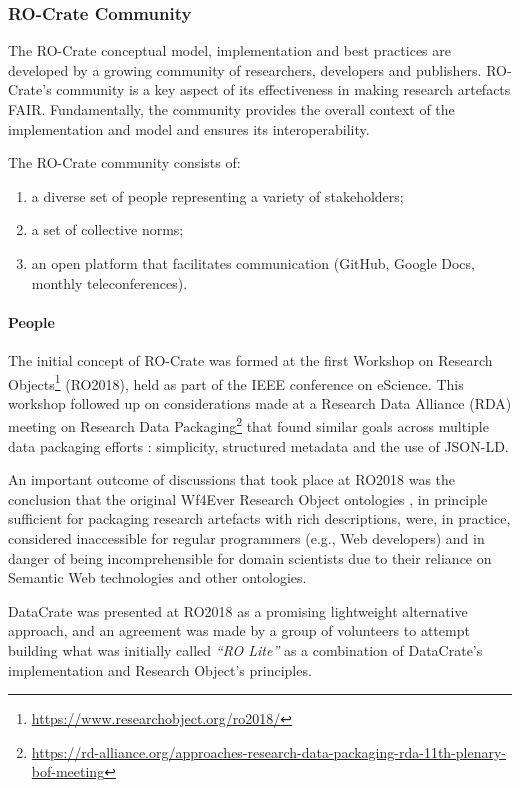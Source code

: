 \subsubsection{RO-Crate Community}\label{ch5:community}

The RO-Crate conceptual model, implementation and best practices are
developed by a growing community of researchers, developers and
publishers. RO-Crate's community is a key aspect of its effectiveness in
making research artefacts FAIR. Fundamentally, the community provides
the overall context of the implementation and model and ensures its
interoperability.

The RO-Crate community consists of:

\begin{enumerate}
\item
  a diverse set of people representing a variety of stakeholders;
\item
  a set of collective norms;
\item
  an open platform that facilitates communication (GitHub, Google Docs,
  monthly teleconferences).
\end{enumerate}

\hypertarget{people}{%
\paragraph{People}\label{ch5:people}}

The initial concept of RO-Crate was formed at the first Workshop on
Research Objects\footnote{\url{https://www.researchobject.org/ro2018/}} (RO2018),
held as part of the IEEE conference on eScience. This workshop followed
up on considerations made at a Research Data Alliance (RDA) meeting on
Research Data
Packaging\footnote{\url{https://rd-alliance.org/approaches-research-data-packaging-rda-11th-plenary-bof-meeting}}
that found similar goals across multiple data packaging efforts
\cite{OCarragain 2019}: simplicity, structured metadata and the
use of JSON-LD.

An important outcome of discussions that took place at RO2018 was the
conclusion that the original Wf4Ever Research Object ontologies
\cite{Belhajjame 2015}, in
principle sufficient for packaging research artefacts with rich
descriptions, were, in practice, considered inaccessible for regular
programmers (e.g., Web developers) and in danger of being
incomprehensible for domain scientists due to their reliance on Semantic
Web technologies and other ontologies.

DataCrate \cite{ch5-103} was
presented at RO2018 as a promising lightweight alternative approach, and
an agreement was made by a group of volunteers to attempt building what
was initially called \emph{``RO Lite''} as a combination of DataCrate's
implementation and Research Object's principles.

